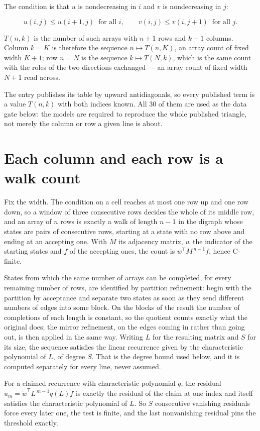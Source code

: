 \documentclass[11pt]{article}
\theoremstyle{definition}
\begin{document}
The condition is that $u$ is nondecreasing in $i$ and $v$ is nondecreasing in $j$:

\[u(i,j) \le u(i{+}1,j) \ \text{ for all } i, \qquad v(i,j) \le v(i,j{+}1) \ \text{ for all } j.\]

$T(n,k)$ is the number of such arrays with $n + 1$ rows and $k + 1$ columns. Column $k = K$ is therefore the sequence $n \mapsto T(n,K)$, an array count of fixed width $K + 1$; row $n = N$ is the sequence $k \mapsto T(N,k)$, which is the same count with the roles of the two directions exchanged --- an array count of fixed width $N + 1$ read across.

The entry publishes its table by upward antidiagonals, so every published term is a value $T(n,k)$ with both indices known. All 30 of them are used as the data gate below: the models are required to reproduce the whole published triangle, not merely the column or row a given line is about.

\section{Each column and each row is a walk count}

Fix the width. The condition on a cell reaches at most one row up and one row down, so a window of three consecutive rows decides the whole of its middle row, and an array of $n$ rows is exactly a walk of length $n-1$ in the digraph whose states are pairs of consecutive rows, starting at a state with no row above and ending at an accepting one. With $M$ its adjacency matrix, $w$ the indicator of the starting states and $f$ of the accepting ones, the count is $w^{\mathsf T}M^{\,n-1}f$, hence C-finite.

States from which the same number of arrays can be completed, for every remaining number of rows, are identified by partition refinement: begin with the partition by acceptance and separate two states as soon as they send different numbers of edges into some block. On the blocks of the result the number of completions of each length is constant, so the quotient counts exactly what the original does; the mirror refinement, on the edges coming in rather than going out, is then applied in the same way. Writing $L$ for the resulting matrix and $S$ for its size, the sequence satisfies the linear recurrence given by the characteristic polynomial of $L$, of degree $S$. That is the degree bound used below, and it is computed separately for every line, never assumed.

For a claimed recurrence with characteristic polynomial $q$, the residual $u_m = \tilde w^{\mathsf T}L^{\,m-1}q(L)\tilde f$ is exactly the residual of the claim at one index and itself satisfies the characteristic polynomial of $L$. So $S$ consecutive vanishing residuals force every later one, the test is finite, and the last nonvanishing residual pins the threshold exactly.
\end{document}

